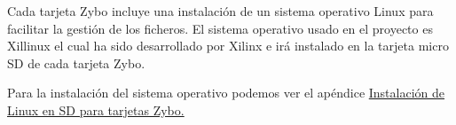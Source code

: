 Cada tarjeta Zybo incluye una instalación de un sistema operativo Linux para facilitar la gestión de los ficheros. El sistema operativo usado en el proyecto es Xillinux el cual ha sido desarrollado por Xilinx e irá instalado en la tarjeta micro SD de cada tarjeta Zybo.

Para la instalación del sistema operativo podemos ver el apéndice \hyperlink{InstalacionLinux}{Instalación de Linux en SD para tarjetas Zybo.}

